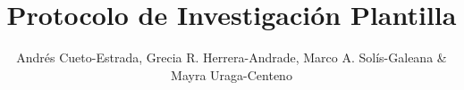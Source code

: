 \title{Protocolo de Investigación Plantilla}
\author{Andrés Cueto-Estrada, Grecia R. Herrera-Andrade, Marco A. Solís-Galeana \& Mayra Uraga-Centeno}
